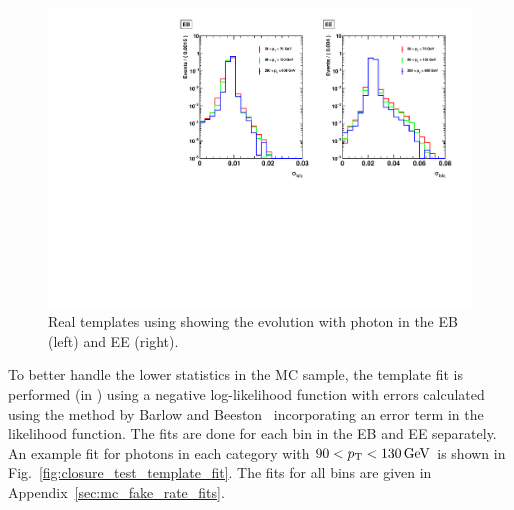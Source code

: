 \begin{figure}[!htbp]
  \centering
  \includegraphics[scale=0.63]{figures/real_templates_sieie_overlaid_sample_all.pdf}
  \caption{Real templates using \sieie showing the evolution with photon \pt in the EB (left) and EE (right).}
  \label{fig:closure_test_real_templates}
\end{figure}

To better handle the lower statistics in the MC sample, the template fit is performed (in \sieie) using a negative log-likelihood function with errors calculated using the method by Barlow and Beeston~\cite{Barlow-Beeston:1993} incorporating an error term in the likelihood function. The fits are done for each \pt bin in the EB and EE separately. An example fit for photons in each category with $90 < p_{\mathrm{T}} < 130\,\text{Ge\hspace{-.08em}V}$ is shown in Fig.~\ref{fig:closure_test_template_fit}. The fits for all \pt bins are given in Appendix~\ref{sec:mc_fake_rate_fits}.

